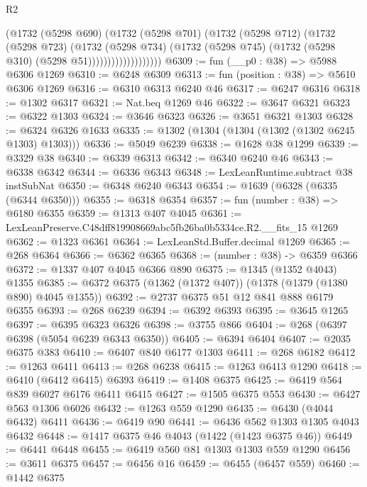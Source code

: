 \begin{lexlean}{R2}
\begin{coremodule}
                          (@1732
                            (@5298 @690)
                            (@1732
                              (@5298 @701)
                              (@1732
                                (@5298 @712)
                                (@1732
                                  (@5298 @723)
                                  (@1732
                                    (@5298 @734)
                                    (@1732
                                      (@5298 @745)
                                      (@1732 (@5298 @310) (@5298 @51)))))))))))))))))))
@6309 := fun (__p0 : @38) => @5988 @6306 @1269
@6310 := @6248 @6309
@6313 := fun (position : @38) => @5610 @6306 @1269
@6316 := @6310 @6313 @6240 @46
@6317 := @6247 @6316
@6318 := @1302 @6317
@6321 := Nat.beq @1269 @46
@6322 := @3647 @6321
@6323 := @6322 @1303
@6324 := @3646 @6323
@6326 := @3651 @6321 @1303
@6328 := @6324 @6326 @1633
@6335 := @1302 (@1304 (@1304 (@1302 (@1302 @6245 @1303) @1303)))
@6336 := @5049 @6239
@6338 := @1628 @38 @1299
@6339 := @3329 @38
@6340 := @6339 @6313
@6342 := @6340 @6240 @46
@6343 := @6338 @6342
@6344 := @6336 @6343
@6348 := LexLeanRuntime.subtract @38 instSubNat
@6350 := @6348 @6240 @6343
@6354 := @1639 (@6328 (@6335 (@6344 @6350)))
@6355 := @6318 @6354
@6357 := fun (number : @38) => @6180 @6355
@6359 := @1313 @407 @4045
@6361 := LexLeanPreserve.C48dff819908669abc5fb26ba0b5334ce.R2.__fits_15 @1269
@6362 := @1323 @6361
@6364 := LexLeanStd.Buffer.decimal @1269
@6365 := @268 @6364
@6366 := @6362 @6365
@6368 := (number : @38) -> @6359 @6366
@6372 := @1337 @407 @4045 @6366 @890
@6375 := @1345 (@1352 @4043) @1355
@6385 := @6372 @6375 (@1362 (@1372 @407)) (@1378 (@1379 (@1380 @890) @4045 @1355))
@6392 := @2737 @6375 @51 @12 @841 @888 @6179 @6355
@6393 := @268 @6239
@6394 := @6392 @6393
@6395 := @3645 @1265
@6397 := @6395 @6323 @6326
@6398 := @3755 @866
@6404 := @268 (@6397 @6398 (@5054 @6239 @6343 @6350))
@6405 := @6394 @6404
@6407 := @2035 @6375 @383
@6410 := @6407 @840 @6177 @1303
@6411 := @268 @6182
@6412 := @1263 @6411
@6413 := @268 @6238
@6415 := @1263 @6413 @1290
@6418 := @6410 (@6412 @6415) @6393
@6419 := @1408 @6375
@6425 := @6419 @564 @839 @6027 @6176 @6411 @6415
@6427 := @1505 @6375 @553
@6430 := @6427 @563 @1306 @6026
@6432 := @1263 @559 @1290
@6435 := @6430 (@4044 @6432) @6411
@6436 := @6419 @90
@6441 := @6436 @562 @1303 @1305 @4043 @6432
@6448 := @1417 @6375 @46 @4043 (@1422 (@1423 @6375 @46))
@6449 := @6441 @6448
@6455 := @6419 @560 @81 @1303 @1303 @559 @1290
@6456 := @3611 @6375
@6457 := @6456 @16
@6459 := @6455 (@6457 @559)
@6460 := @1442 @6375

\end{coremodule}
\end{lexlean}
